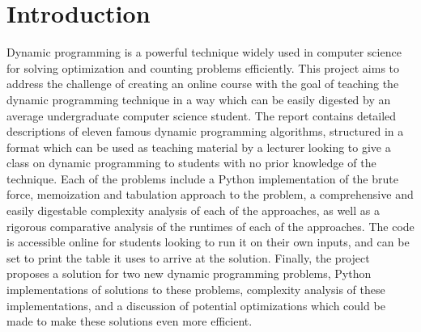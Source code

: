 \chapter{Introduction}
Dynamic programming is a powerful technique widely used in computer science for solving optimization and counting problems efficiently.
This project aims to address the challenge of creating an online course with the goal of teaching the dynamic programming technique in a way which can be easily digested by an average undergraduate computer science student.
The report contains detailed descriptions of eleven famous dynamic programming algorithms,
structured in a format which can be used as teaching material by a lecturer looking to give a class on dynamic programming to students with no prior knowledge of the technique.
Each of the problems include a Python implementation of the brute force, memoization and tabulation approach to the problem, a comprehensive and easily digestable complexity analysis of each of the approaches, as well as a rigorous comparative analysis of the runtimes of each of the approaches.
The code is accessible online for students looking to run it on their own inputs, and can be set to print the table it uses to arrive at the solution.
Finally, the project proposes a solution for two new dynamic programming problems, Python implementations of solutions to these problems, complexity analysis of these implementations, and a discussion of potential optimizations which could be made to make these solutions even more efficient.

